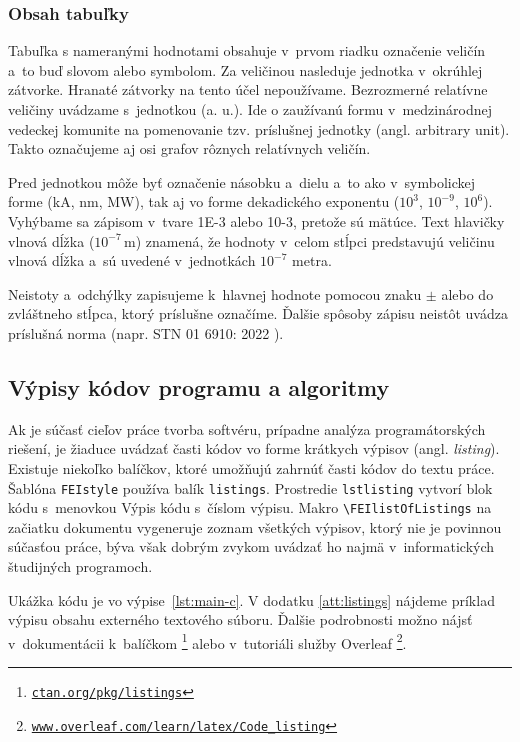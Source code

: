 \subsubsection{Obsah tabuľky}
Tabuľka s nameranými hodnotami obsahuje v~prvom riadku označenie
veličín a~to buď slovom alebo symbolom.
Za veličinou nasleduje jednotka v~okrúhlej zátvorke.
Hranaté zátvorky na tento účel nepoužívame.
Bezrozmerné relatívne veličiny uvádzame s~jednotkou (a. u.).
Ide o zaužívanú formu v~medzinárodnej vedeckej komunite na pomenovanie tzv. príslušnej jednotky (angl. \foreignlanguage{english}{arbitrary unit}).
Takto označujeme aj osi grafov rôznych relatívnych veličín.

Pred jednotkou môže byť označenie násobku
a~dielu a~to ako v~symbolickej forme (kA, nm, MW),
tak aj vo forme dekadického exponentu ($10^3$, $10^{-9}$, $10^6$).
Vyhýbame sa zápisom v~tvare 1E-3 alebo 10-3,
pretože sú mätúce.
Text hlavičky vlnová dĺžka ($10^{-7}$\,m) znamená,
že hodnoty v~celom stĺpci predstavujú veličinu vlnová dĺžka
a~sú uvedené v~jednotkách $10^{-7}$ metra.

Neistoty a~odchýlky zapisujeme k~hlavnej hodnote pomocou
znaku $\pm$ alebo do zvláštneho stĺpca,
ktorý príslušne označíme.
Ďalšie spôsoby zápisu neistôt uvádza príslušná norma (napr. STN 01 6910: 2022 \cite{stn016910}).

\subsection{Výpisy kódov programu a algoritmy}
\label{sec:listings}
Ak je súčasť cieľov práce tvorba softvéru, prípadne analýza programátorských riešení,
je žiaduce uvádzať časti kódov vo forme krátkych výpisov (angl. \foreignlanguage{english}{\emph{listing}}).
Existuje niekoľko balíčkov, ktoré umožňujú zahrnúť časti kódov do textu práce.
Šablóna \verb|FEIstyle| používa balík \verb|listings|.
Prostredie \verb|lstlisting| vytvorí blok kódu s~menovkou Výpis kódu s~číslom výpisu.
Makro \verb|\FEIlistOfListings| na začiatku dokumentu vygeneruje zoznam všetkých výpisov,
ktorý nie je povinnou súčasťou práce,
býva však dobrým zvykom uvádzať ho najmä v~informatických študijných programoch.

Ukážka kódu je vo výpise~\ref{lst:main-c}.
V dodatku \ref{att:listings} nájdeme príklad výpisu obsahu externého textového súboru.
Ďalšie podrobnosti možno nájsť v~dokumentácii k~balíčkom%
\footnote{\href{https://ctan.org/pkg/listings}{\texttt{ctan.org/pkg/listings}}}
alebo v~tutoriáli služby Overleaf%
\footnote{\texttt{\href{https://www.overleaf.com/learn/latex/Code_listing}{www.overleaf.com/learn/latex/Code\_listing}}}.

